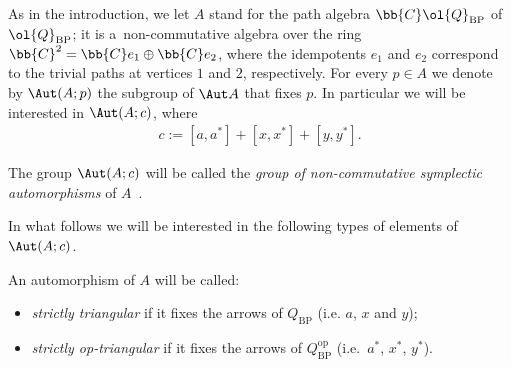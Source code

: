 As in the introduction, we let \(A\) stand for the path algebra \(\bb{C}\ol{Q}_{\mathrm{BP}}\) of
\(\ol{Q}_{\mathrm{BP}}\); it is a~non-commutative algebra over the ring \(\bb{C}^{2} = \bb{C}e_{1} \oplus
\bb{C}e_{2}\), where the idempotents \(e_{1}\) and \(e_{2}\) correspond to the trivial paths at vertices
\(1\) and \(2\), respectively.
For every \(p\in A\) we denote by \(\Aut (A;p)\) the subgroup of \(\Aut A\) that f\/ixes \(p\).
In particular we will be interested in \(\Aut (A;c)\), where
\begin{gather*}
c\mathrel{:=}[a,a^{*}]+[x,x^{*}]+[y,y^{*}].
\end{gather*}

\begin{definition}
The group \(\Aut (A;c)\) will be called the \textit{group of non-commutative symplectic automorphisms} of
\(A\)~\cite{bp08, kont93}.
\end{definition}

In what follows we will be interested in the following types of elements of \(\Aut (A;c)\).
\begin{definition}
An automorphism of \(A\) will be called:
\begin{itemize}\itemsep=0pt
\item \textit{strictly triangular} if it f\/ixes the arrows of \(Q_{\mathrm{BP}}\) (i.e.
\(a\), \(x\) and \(y\));
\item \textit{strictly op-triangular} if it f\/ixes the arrows of
\(Q_{\mathrm{BP}}^{\mathrm{op}}\) (i.e.\
\(a^{*}\), \(x^{*}\), \(y^{*}\)).
\end{itemize}
\end{definition}

